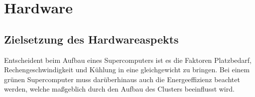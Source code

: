 \section{Hardware}

\subsection{Zielsetzung des Hardwareaspekts}
Entscheident beim Aufbau eines Supercomputers ist
es die Faktoren Platzbedarf, Rechengeschwindigkeit und Kühlung 
in eine gleichgewicht zu bringen. Bei einem grünen Supercomputer 
muss darüberhinaus auch die Energeeffizienz beachtet werden,
welche maßgeblich durch den Aufbau des Clusters beeinflusst wird.


